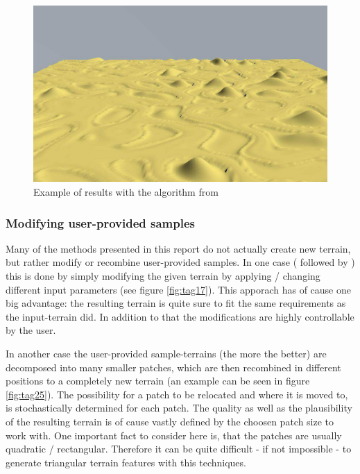 \begin{figure}[htb]
	\centering
	\includegraphics[width=\linewidth]{RZL12/06256610.jpg}
	\caption{Example of results with the algorithm from \cite{frade2010evolution2}}
	\label{fig:tag21}
\end{figure}

\subsubsection{Modifying user-provided samples}
Many of the methods presented in this report do not actually create new terrain, but rather modify or recombine user-provided samples. In one case (\cite{walsh2010terrain} followed by \cite{walsh2011use}) this is done by simply modifying the given terrain by applying / changing different input parameters (see figure \ref{fig:tag17}). This apporach has of cause one big advantage: the resulting terrain is quite sure to fit the same requirements as the input-terrain did. In addition to that the modifications are highly controllable by the user.

In another case \cite{raffe2011evolving} the user-provided sample-terrains (the more the better) are decomposed into many smaller patches, which are then recombined in different positions to a completely new terrain (an example can be seen in figure \ref{fig:tag25}). The possibility for a patch to be relocated and where it is moved to, is stochastically determined for each patch. The quality as well as the plausibility of the resulting terrain is of cause vastly defined by the choosen patch size to work with. One important fact to consider here is, that the patches are usually quadratic / rectangular. Therefore it can be quite difficult - if not impossible - to generate triangular terrain features with this techniques.

